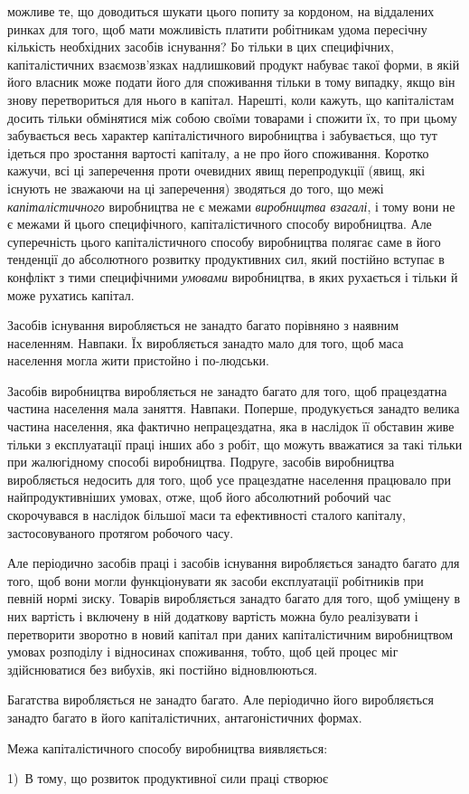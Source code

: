 \parcont{}  %
можливе те, що доводиться шукати цього попиту за кордоном, на
віддалених ринках для того, щоб мати можливість платити робітникам
удома пересічну кількість необхідних засобів існування? Бо
тільки в цих специфічних, капіталістичних взаємозв’язках надлишковий
продукт набуває такої форми, в якій його власник
може подати його для споживання тільки в тому випадку, якщо
він знову перетвориться для нього в капітал. Нарешті, коли
кажуть, що капіталістам досить тільки обмінятися між собою
своїми товарами і спожити їх, то при цьому забувається весь
характер капіталістичного виробництва і забувається, що тут
ідеться про зростання вартості капіталу, а не про його споживання.
Коротко кажучи, всі ці заперечення проти очевидних явищ
перепродукції (явищ, які існують не зважаючи на ці заперечення)
зводяться до того, що межі \emph{капіталістичного} виробництва не
є межами \emph{виробництва взагалі}, і тому вони не є межами й цього
специфічного, капіталістичного способу виробництва. Але суперечність
цього капіталістичного способу виробництва полягає
саме в його тенденції до абсолютного розвитку продуктивних сил,
який постійно вступає в конфлікт з тими специфічними \emph{умовами}
виробництва, в яких рухається і тільки й може рухатись капітал.

Засобів існування виробляється не занадто багато порівняно
з наявним населенням. Навпаки. Їх виробляється занадто мало
для того, щоб маса населення могла жити пристойно і по-людськи.

Засобів виробництва виробляється не занадто багато для
того, щоб працездатна частина населення мала заняття. Навпаки.
Поперше, продукується занадто велика частина населення, яка
фактично непрацездатна, яка в наслідок її обставин живе тільки
з експлуатації праці інших або з робіт, що можуть вважатися
за такі тільки при жалюгідному способі виробництва. Подруге,
засобів виробництва виробляється недосить для того, щоб усе
працездатне населення працювало при найпродуктивніших умовах,
отже, щоб його абсолютний робочий час скорочувався
в наслідок більшої маси та ефективності сталого капіталу, застосовуваного
протягом робочого часу.

Але періодично засобів праці і засобів існування виробляється
занадто багато для того, щоб вони могли функціонувати
як засоби експлуатації робітників при певній нормі зиску. Товарів
виробляється занадто багато для того, щоб уміщену в них
вартість і включену в ній додаткову вартість можна було реалізувати
і перетворити зворотно в новий капітал при даних капіталістичним
виробництвом умовах розподілу і відносинах споживання,
тобто, щоб цей процес міг здійснюватися без вибухів,
які постійно відновлюються.

Багатства виробляється не занадто багато. Але періодично
його виробляється занадто багато в його капіталістичних, антагоністичних
формах.

Межа капіталістичного способу виробництва виявляється:

1)~В тому, що розвиток продуктивної сили праці створює
\parbreak{}  %
